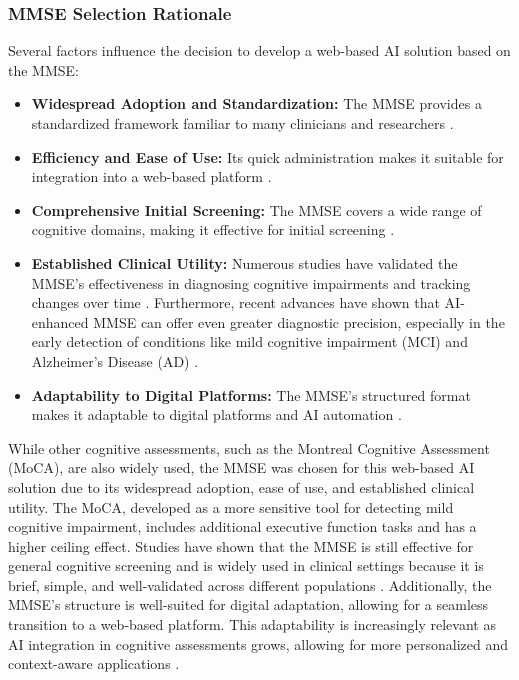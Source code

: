 \subsubsection{MMSE Selection Rationale}
Several factors influence the decision to develop a web-based AI solution based on the MMSE:
\begin{itemize}
    \item \textbf{Widespread Adoption and Standardization:} The MMSE provides a standardized framework familiar to many clinicians and researchers \cite{Folstein1975, Crum1993}.
    \item \textbf{Efficiency and Ease of Use:} Its quick administration makes it suitable for integration into a web-based platform \cite{Tombaugh1992}.
    \item \textbf{Comprehensive Initial Screening:} The MMSE covers a wide range of cognitive domains, making it effective for initial screening \cite{Tombaugh1992}.
    \item \textbf{Established Clinical Utility:} Numerous studies have validated the MMSE's effectiveness in diagnosing cognitive impairments and tracking changes over time \cite{Salmon1990, Mitchell2009}. Furthermore, recent advances have shown that AI-enhanced MMSE can offer even greater diagnostic precision, especially in the early detection of conditions like mild cognitive impairment (MCI) and Alzheimer’s Disease (AD) \cite{Formica2023}.
    \item \textbf{Adaptability to Digital Platforms:} The MMSE's structured format makes it adaptable to digital platforms and AI automation \cite{Zygouris2017}.
\end{itemize}

While other cognitive assessments, such as the Montreal Cognitive Assessment (MoCA), are also widely used, the MMSE was chosen for this web-based AI solution due to its widespread adoption, ease of use, and established clinical utility. The MoCA, developed as a more sensitive tool for detecting mild cognitive impairment, includes additional executive function tasks and has a higher ceiling effect. Studies have shown that the MMSE is still effective for general cognitive screening and is widely used in clinical settings because it is brief, simple, and well-validated across different populations \cite{Nasreddine2005, Tsoi2015}. Additionally, the MMSE’s structure is well-suited for digital adaptation, allowing for a seamless transition to a web-based platform. This adaptability is increasingly relevant as AI integration in cognitive assessments grows, allowing for more personalized and context-aware applications \cite{Peng2020}.


